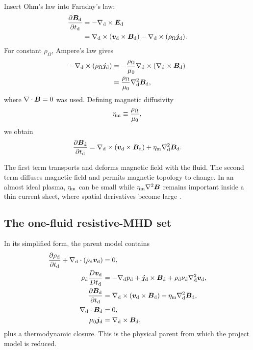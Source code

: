 Insert Ohm's law into Faraday's law:
\begin{align}
\frac{\partial\bm{B}_{\rm d}}{\partial t_{\rm d}}
&=-\nabla_{\rm d}\times\bm{E}_{\rm d}\\
&=\nabla_{\rm d}\times(\bm{v}_{\rm d}\times\bm{B}_{\rm d})
-\nabla_{\rm d}\times(\rho_{\Omega}\bm{j}_{\rm d}).
\end{align}
For constant $\rho_{\Omega}$, Ampere's law gives
\begin{align}
-\nabla_{\rm d}\times(\rho_{\Omega}\bm{j}_{\rm d})
&=-\frac{\rho_{\Omega}}{\mu_0}
\nabla_{\rm d}\times(\nabla_{\rm d}\times\bm{B}_{\rm d})\\
&=\frac{\rho_{\Omega}}{\mu_0}\nabla_{\rm d}^{2}\bm{B}_{\rm d},
\end{align}
where $\nabla\cdot\bm{B}=0$ was used. Defining magnetic diffusivity
\begin{equation}
\eta_{\rm m}\equiv\frac{\rho_{\Omega}}{\mu_0},
\end{equation}
we obtain
\begin{equation}
\frac{\partial\bm{B}_{\rm d}}{\partial t_{\rm d}}
=\nabla_{\rm d}\times(\bm{v}_{\rm d}\times\bm{B}_{\rm d})
+\eta_{\rm m}\nabla_{\rm d}^{2}\bm{B}_{\rm d}.
\label{eq:induction_dim}
\end{equation}

The first term transports and deforms magnetic field with the fluid. The second term diffuses magnetic field and permits magnetic topology to change. In an almost ideal plasma, $\eta_{\rm m}$ can be small while $\eta_{\rm m}\nabla^2\bm{B}$ remains important inside a thin current sheet, where spatial derivatives become large \cite{Goedbloed2004,Goedbloed2010}.

\subsection{The one-fluid resistive-MHD set}

In its simplified form, the parent model contains
\begin{align}
\frac{\partial\rho_{\rm d}}{\partial t_{\rm d}}
+\nabla_{\rm d}\cdot(\rho_{\rm d}\bm{v}_{\rm d})&=0,\\
\rho_{\rm d}\frac{D\bm{v}_{\rm d}}{Dt_{\rm d}}
&=-\nabla_{\rm d}p_{\rm d}+\bm{j}_{\rm d}\times\bm{B}_{\rm d}
+\rho_{\rm d}\nu_{\rm d}\nabla_{\rm d}^2\bm{v}_{\rm d},\\
\frac{\partial\bm{B}_{\rm d}}{\partial t_{\rm d}}
&=\nabla_{\rm d}\times(\bm{v}_{\rm d}\times\bm{B}_{\rm d})
+\eta_{\rm m}\nabla_{\rm d}^2\bm{B}_{\rm d},\\
\nabla_{\rm d}\cdot\bm{B}_{\rm d}&=0,\\
\mu_0\bm{j}_{\rm d}&=\nabla_{\rm d}\times\bm{B}_{\rm d},
\end{align}
plus a thermodynamic closure. This is the physical parent from which the project model is reduced.

